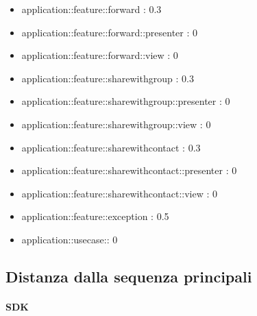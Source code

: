 \begin{itemize}
\item application::feature::forward : 0.3
\item application::feature::forward::presenter : 0
\item application::feature::forward::view : 0
\item application::feature::sharewithgroup : 0.3
\item application::feature::sharewithgroup::presenter : 0
\item application::feature::sharewithgroup::view : 0
\item application::feature::sharewithcontact : 0.3
\item application::feature::sharewithcontact::presenter : 0 
\item application::feature::sharewithcontact::view : 0
\item application::feature::exception : 0.5
\item application::usecase:: 0

\end{itemize}

\subsection{Distanza dalla sequenza principali}

\paragraph{SDK}

